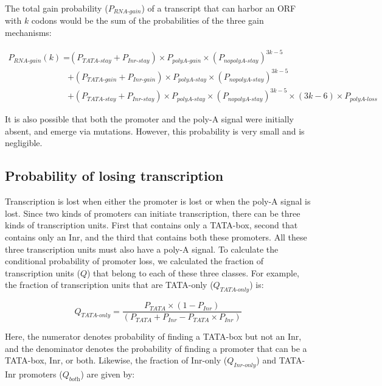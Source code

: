 \documentclass[12pt,a4paper]{article}
\begin{document}
The total gain probability ($P_\textit{RNA-gain}$) of a transcript that can harbor an ORF with $k$ codons  would be the sum of the probabilities of the three gain mechanisms:

\begin{align}
P_\textit{RNA-gain}(k)  = & \ (P_\textit{TATA-stay} + P_\textit{Inr-stay})\times P_\textit{polyA-gain}\times (P_\textit{nopolyA-stay})^{3k-5} \nonumber\\[1ex]
%
& + (P_\textit{TATA-gain} + P_\textit{Inr-gain})\times P_\textit{polyA-stay}\times (P_\textit{nopolyA-stay})^{3k-5} \nonumber \\[1ex]
& + (P_\textit{TATA-stay} + P_\textit{Inr-stay})\times P_\textit{polyA-stay}\times (P_\textit{nopolyA-stay})^{3k-5} \times (3k-6) \times P_\textit{polyA-loss}
\label{eqrnagain}
\end{align}

It is also possible that both the promoter and the poly-A signal were initially absent, and emerge via mutations. However, this probability is very small and is negligible.


\subsection{Probability of losing transcription}

Transcription is lost when either the promoter is lost or when the poly-A signal is lost. Since two kinds of promoters can initiate transcription, there can be three kinds of transcription units. First that contains only a TATA-box, second that contains only an Inr, and the third that contains both these promoters. All these three transcription units must also have a poly-A signal. To calculate the conditional probability of promoter loss, we calculated the fraction of transcription units ($Q$) that belong to each of these three classes. For example, the fraction of transcription units that are TATA-only ($Q_\textit{TATA-only}$) is:

\begin{equation*}
Q_\textit{TATA-only} = \frac{P_\textit{TATA}\times(1 - P_\textit{Inr})}{(P_\textit{TATA} + P_\textit{Inr} - P_\textit{TATA}\times P_\textit{Inr})}
\end{equation*}

\vspace{1ex}

Here, the numerator denotes probability of finding a TATA-box but not an Inr, and the denominator denotes the probability of finding a promoter that can be a TATA-box, Inr, or both. Likewise, the fraction of Inr-only ($Q_\textit{Inr-only}$) and TATA-Inr promoters ($Q_\textit{both}$) are given by:
\end{document}
